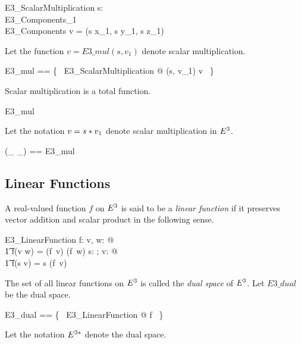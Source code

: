 \documentclass{amsart}
\begin{document}
\begin{schema}{E3\_ScalarMultiplication}
	s: \R \\
	E3\_Components_1 \\
	E3\_Components
\where
	v = (s \mulR x_1, s \mulR y_1, s \mulR z_1)
\end{schema}

Let the function $v = E3\_mul(s, v_1)$ denote scalar multiplication.

\begin{zed}
	E3\_mul == \{~ E3\_ScalarMultiplication @ (s, v_1) \mapsto v ~\}
\end{zed}

\begin{remark} 
Scalar multiplication is a total function.
\begin{zed}
	E3\_mul \in \R \cross \Ethree \fun \Ethree
\end{zed}
\end{remark}

Let the notation $v = s \mathbin{*} v_1$ denote scalar multiplication in $E^3$.

\begin{zed}
	(\_ \mulEthree \_) == E3\_mul
\end{zed}

\subsection{Linear Functions}

A real-valued function $f$ on $E^3$ is said to be a \textit{linear function} if it preserves vector addition and scalar product
in the following sense.

\begin{schema}{E3\_LinearFunction}
	f: \Ethree \fun \R
\where
	\forall v, w: \Ethree @ \\
	\t1	f(v \addEthree w) = (f~v) \addR (f~w)
\also
	\forall s: \R; v: \Ethree @ \\
	\t1	f(s \mulEthree v) = s \mulR (f~v)	
\end{schema}

The set of all linear functions on $E^3$ is called the \textit{dual space} of $E^3$.
Let $E3\_dual$ be the dual space.

\begin{zed}
	E3\_dual == \{~ E3\_LinearFunction @ f ~\}
\end{zed}

Let the notation $E^{3*}$ denote the dual space.
\end{document}
